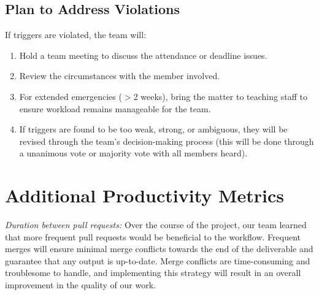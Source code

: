 \documentclass{article}
\begin{document}
\subsection{Plan to Address Violations}
If triggers are violated, the team will:

\begin{enumerate}
    \item Hold a team meeting to discuss the attendance or deadline issues.
    \item Review the circumstances with the member involved.
    \item For extended emergencies ($>$2 weeks), bring the matter to teaching staff to ensure workload remains manageable for the team.
    \item If triggers are found to be too weak, strong, or ambiguous, they will be revised through the team's decision-making process (this will be done through a unanimous vote or majority vote with all members heard).
\end{enumerate}

\section{Additional Productivity Metrics}

\textit{Duration between pull requests:} Over the course of the project, our team learned that more frequent pull requests would be beneficial to the workflow. Frequent merges will ensure minimal merge conflicts towards the end of the deliverable and guarantee that any output is up-to-date. Merge conflicts are time-consuming and troublesome to handle, and implementing this strategy will result in an overall improvement in the quality of our work. 
\end{document}
